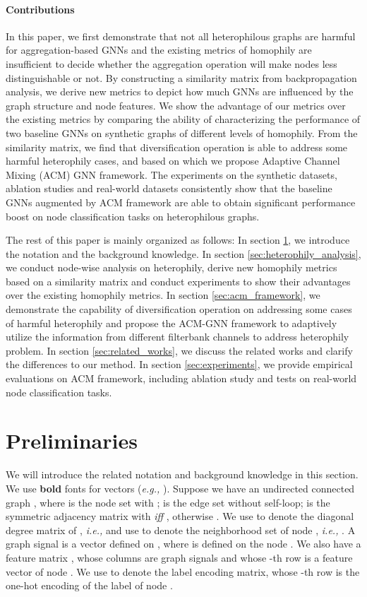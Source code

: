 \documentclass{article}
\newcommand\ie{\textit{i.e.,}}
\newcommand\eg{\textit{e.g.,}}
\newcommand{\0}{{\boldsymbol{0}}}
\newcommand{\6}{{\partial}}
\newcommand{\8}{{\infty}}
\newcommand{\4}{{\nabla}}
\begin{document}
\paragraph{Contributions} In this paper, we first demonstrate that not all heterophilous graphs are harmful for aggregation-based GNNs and the existing metrics of homophily are insufficient to decide whether the aggregation operation will make nodes less distinguishable or not. By constructing a similarity matrix from backpropagation analysis, we derive new metrics to depict how much GNNs are influenced by the graph structure and node features. We show the advantage of our metrics over the existing metrics by comparing the ability of characterizing the performance of two baseline GNNs on synthetic graphs of different levels of homophily. From the similarity matrix, we find that diversification operation is able to address some harmful heterophily cases, and based on which we propose Adaptive Channel Mixing (ACM) GNN framework. The experiments on the synthetic datasets, ablation studies and real-world datasets consistently show that the baseline GNNs augmented by ACM framework are able to obtain significant performance boost on node classification tasks on heterophilous graphs.



The rest of this paper is mainly organized as follows: In section \ref{sec:prelimiary_notation}, we introduce the notation and the background knowledge. In section \ref{sec:heterophily_analysis}, we conduct node-wise analysis on heterophily, derive new homophily metrics based on a similarity matrix and conduct experiments to show their advantages over the existing homophily metrics. In section \ref{sec:acm_framework}, we demonstrate the capability of diversification operation on addressing some cases of harmful heterophily and propose the ACM-GNN framework to adaptively utilize the information from different filterbank channels to address heterophily problem. In section \ref{sec:related_works}, we discuss the related works and clarify the differences to our method. In section \ref{sec:experiments}, we provide empirical evaluations on ACM framework, including ablation study and tests on  real-world node classification tasks.


\section{Preliminaries}
\label{sec:prelimiary_notation}
We will introduce the related notation and background knowledge in this section. We use \textbf{bold} fonts for vectors (\eg{} ). Suppose we have an undirected connected graph , where  is the node set with ;  is the edge set without self-loop;  is the symmetric adjacency matrix with  \textit{iff} , otherwise .
We use  to denote the diagonal degree matrix of , \ie{}  and 
use  to denote the neighborhood set of node , \ie{}  . A graph signal is a vector  defined on , where  is defined on the node . We also have a feature matrix , whose columns are graph signals and whose -th row   is a feature vector of node . We use  to denote the label encoding matrix, whose -th row   is the one-hot encoding of the label of node . 
\end{document}
